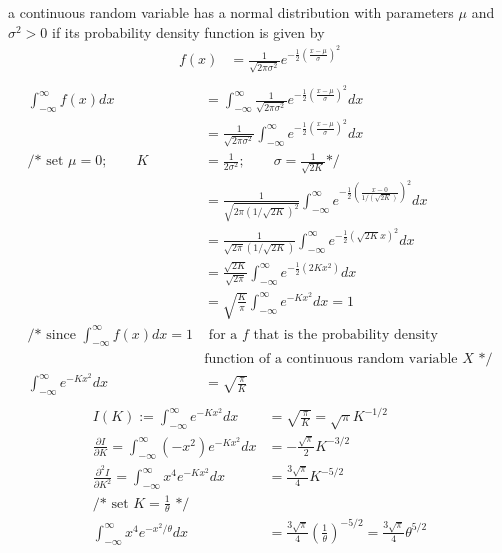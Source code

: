 \documentclass[12pt,border=4pt,multi]{article} %
\begin{document}
a continuous random variable has a normal distribution with parameters $\mu$ and $\sigma^2 > 0$ if its probability density function is given by
{\large
\begin{align*}
f(x) &= \frac{1}{\sqrt{2\pi\sigma^2}} e^{-\frac{1}{2}\left(\frac{x - \mu}{\sigma}\right)^2}\\
\end{align*}}
\begin{align*}
\int_{-\infty}^{\infty} f(x) dx &= \int_{-\infty}^{\infty} \frac{1}{\sqrt{2\pi\sigma^2}} e^{-\frac{1}{2}\left(\frac{x - \mu}{\sigma}\right)^2} dx\\
&= \frac{1}{\sqrt{2\pi\sigma^2}} \int_{-\infty}^{\infty} e^{-\frac{1}{2}\left(\frac{x - \mu}{\sigma}\right)^2} dx\\
\text{/* set } \mu = 0; \qquad K &= \frac{1}{2\sigma^2}; \qquad \sigma = \frac{1}{\sqrt{2K}} \text{*/}\\
&= \frac{1}{\sqrt{2\pi(1/\sqrt{2K})^2}} \int_{-\infty}^{\infty} e^{-\frac{1}{2}\left(\frac{x - 0}{1/(\sqrt{2K})}\right)^2} dx\\
&= \frac{1}{\sqrt{2\pi}(1/\sqrt{2K})} \int_{-\infty}^{\infty} e^{-\frac{1}{2}\left(\sqrt{2K}x\right)^2} dx\\
&= \frac{\sqrt{2K}}{\sqrt{2\pi}} \int_{-\infty}^{\infty} e^{-\frac{1}{2}\left(2Kx^2\right)} dx\\
&= \sqrt{\frac{K}{\pi}} \int_{-\infty}^{\infty} e^{-Kx^2} dx = 1\\
\text{/* since } \int_{-\infty}^{\infty} f(x)dx  = 1 &\text{ for a $f$ that is the probability density}\\
&\text{function of a continuous random variable $X$}\text{ */}\\
\int_{-\infty}^{\infty} e^{-Kx^2} dx &= \sqrt{\frac{\pi}{K}}\\
\end{align*}
\begin{align*}
I(K) := \int_{-\infty}^{\infty} e^{-Kx^2} dx &= \sqrt{\frac{\pi}{K}} = \sqrt{\pi}K^{-1 / 2}\\
\frac{\partial I}{\partial K} = \int_{-\infty}^{\infty} (-x^2)e^{-Kx^2} dx &= -\frac{\sqrt{\pi}}{2}K^{-3 / 2}\\
\frac{\partial^2 I}{\partial K^2} = \int_{-\infty}^{\infty} x^4 e^{-Kx^2} dx &= \frac{3\sqrt{\pi}}{4}K^{-5 / 2}\\
\text{/* set } K = \frac{1}{\theta} \text{ */}\\
\int_{-\infty}^{\infty} x^4 e^{-x^2 / \theta} dx &= \frac{3\sqrt{\pi}}{4}\left(\frac{1}{\theta}\right)^{-5 / 2}
= \frac{3\sqrt{\pi}}{4}\theta^{5 / 2}\\
\end{align*}
\end{document}
